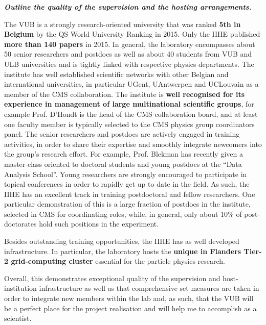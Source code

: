 \begin{center}
\textbf{\textit{{\Large Outline the quality of the supervision and the hosting arrangements.}}}\\
\end{center}
The VUB is a strongly research-oriented university that was ranked \textbf{5th in Belgium} by the QS World University Ranking in 2015. Only the IIHE published \textbf{more than 140 papers} in 2015. In general, the laboratory encompasses about 50 senior researchers and postdocs as well as about 40 students from VUB and ULB universities and is tightly linked with respective physics departments. The institute has well established scientific networks with other Belgian and international universities, in particular UGent, UAntwerpen and UCLouvain as a member of the CMS collaboration. The institute is \textbf{well recognised for its experience in management of large multinational scientific groups}, for example Prof. D'Hondt is the head of the CMS collaboration board, and at least one faculty member is typically selected to the CMS physics group coordinators panel. The senior researchers and postdocs are actively engaged in training activities, in order to share their expertise and smoothly integrate newcomers into the group's research effort. For example, Prof. Blekman has recently given a master-class oriented to doctoral students and young postdocs at the ``Data Analysis School''. Young researchers are strongly encouraged to participate in topical conferences in order to rapidly get up to date in the field. As such, the IIHE has an excellent track in training postdoctoral and fellow researchers. One particular demonstration of this is a large fraction of postdocs in the institute, selected in CMS for coordinating roles, while, in general, only about 10\% of post-doctorates hold such positions in the experiment.

 Besides outstanding training opportunities, the IIHE has as well developed infrastructure. In particular, the laboratory hosts the \textbf{unique in Flanders Tier-2 grid-computing cluster} essential for the particle physics research.

Overall, this demonstrates exceptional quality of the supervision and host-institution infrastructure as well as that comprehensive set measures are taken in order to integrate new members within the lab and, as such, that the VUB will be a perfect place for the project realisation and will help me to accomplish as a scientist.

